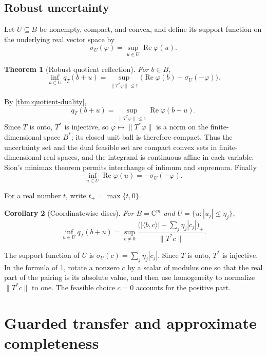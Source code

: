 \documentclass[12pt,a4paper,twoside]{extarticle}
\makeatletter
\theoremstyle{compactplain}
\newtheorem{theorem}{Theorem}[section]
\newtheorem{corollary}[theorem]{Corollary}
\theoremstyle{compactdef}
\renewenvironment{proof}[1][\proofname]{\par\pushQED{\qed}\normalfont
  \topsep2pt\trivlist\item[\hskip\labelsep\bfseries #1\@addpunct{.}]\ignorespaces}
 {\popQED\endtrivlist\@endpefalse}
\makeatother
\begin{document}
\subsection{Robust uncertainty}
Let $U\subseteq B$ be nonempty, compact, and convex, and define its support function on the underlying real vector space by
\[
  \sigma_U(\varphi)=\sup_{u\in U}\operatorname{Re}\varphi(u).
\]
\begin{theorem}[Robust quotient reflection]\label{thm:robust-quotient}
For $b\in B$,
\[
 \inf_{u\in U}q_T(b+u)
 =\sup_{\|T^*\varphi\|\le1}
 \bigl(\operatorname{Re}\varphi(b)-\sigma_U(-\varphi)\bigr).
\]
\end{theorem}
\begin{proof}
By \cref{thm:quotient-duality},
\[
q_T(b+u)=\sup_{\|T^*\varphi\|\le1}\operatorname{Re}\varphi(b+u).
\]
Since $T$ is onto, $T^*$ is injective, so $\varphi\mapsto\|T^*\varphi\|$ is a norm on the finite-dimensional space $B^*$; its closed unit ball is therefore compact.  Thus the uncertainty set and the dual feasible set are compact convex sets in finite-dimensional real spaces, and the integrand is continuous affine in each variable.  Sion's minimax theorem \cite[Theorem~3.4]{sion} permits interchange of infimum and supremum.  Finally
\[
\inf_{u\in U}\operatorname{Re}\varphi(u)=-\sigma_U(-\varphi).
\]
\end{proof}

For a real number $t$, write $t_+=\max\{t,0\}$.
\begin{corollary}[Coordinatewise discs]
For $B=\mathbb C^m$ and $U=\{u:|u_j|\le\eta_j\}$,
\[
 \inf_{u\in U}q_T(b+u)
 =\sup_{c\ne0}
 \frac{\bigl(|\langle b,c\rangle|-\sum_j\eta_j|c_j|\bigr)_+}
 {\|T^*c\|}.
\]
\end{corollary}
\begin{proof}
The support function of $U$ is $\sigma_U(c)=\sum_j\eta_j|c_j|$.  Since $T$ is onto, $T^*$ is injective.  In the formula of \cref{thm:robust-quotient}, rotate a nonzero $c$ by a scalar of modulus one so that the real part of the pairing is its absolute value, and then use homogeneity to normalize $\|T^*c\|$ to one.  The feasible choice $c=0$ accounts for the positive part.
\end{proof}

\section{Guarded transfer and approximate completeness}\label{sec:guarded-transfer}
\end{document}
